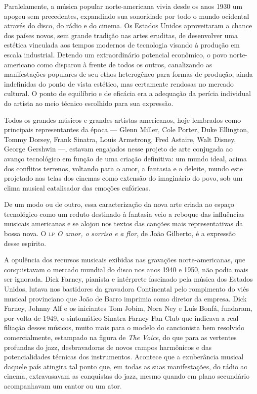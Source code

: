 Paralelamente, a música popular norte-americana vivia desde os anos 1930
um apogeu sem precedentes, expandindo sua sonoridade por todo o mundo
ocidental através do disco, do rádio e do cinema. Os Estados Unidos
aproveitaram a chance dos países novos, sem grande tradição nas artes
eruditas, de desenvolver uma estética vinculada aos tempos modernos de
tecnologia visando à produção em escala industrial. Detendo um
extraordinário potencial econômico, o povo norte-americano como disparou
à frente de todos os outros, canalizando as manifestações populares de
seu ethos heterogêneo para formas de produção, ainda indefinidas do
ponto de vista estético, mas certamente rendosas no mercado cultural. O
ponto de equilíbrio e de eficácia era a adequação da perícia individual
do artista ao meio técnico escolhido para sua expressão.

Todos os grandes músicos e grandes artistas americanos, hoje lembrados
como principais representantes da época --- Glenn Miller, Cole Porter, Duke
Ellington, Tommy Dorsey, Frank Sinatra, Louis Armstrong, Fred Astaire,
Walt Disney, George Gershwin ---, estavam engajados nesse projeto de arte
conjugada ao avanço tecnológico em função de uma criação definitiva: um
mundo ideal, acima dos conflitos terrenos, voltando para o amor, a
fantasia e o deleite, mundo este projetado nas telas dos cinemas como
extensão do imaginário do povo, sob um clima musical catalisador das
emoções eufóricas.

De um modo ou de outro, essa caracterização da nova arte criada no
espaço tecnológico como um reduto destinado à fantasia veio a reboque
das influências musicais americanas e se alojou nos textos das canções
mais representativas da bossa nova. O \textsc{lp} \textit{O amor, o sorriso e a flor}, de
João Gilberto, é a expressão desse espírito.

A opulência dos recursos musicais exibidas nas gravações
norte-americanas, que conquistavam o mercado mundial do disco nos anos
1940 e 1950, não podia mais ser ignorada. Dick Farney, pianista e intérprete
fascinado pela música dos Estados Unidos, lutava nos bastidores da
gravadora Continental pelo rompimento do viés musical provinciano que
João de Barro imprimia como diretor da empresa. Dick Farney, Johnny Alf
e os iniciantes Tom Jobim, Nora Ney e Luís Bonfá, fundaram, por volta de
1949, o sintomático Sinatra-Farney Fan Club que indicava a real filiação
desses músicos, muito mais para o modelo do cancionista bem resolvido
comercialmente, estampado na figura de \textit{The Voice}, do que para as
vertentes profundas do jazz, desbravadoras de novos campos harmônicos e
das potencialidades técnicas dos instrumentos. Acontece que a
exuberância musical daquele país atingira tal ponto que, em todas as
suas manifestações, do rádio ao cinema, extravasavam as conquistas do
jazz, mesmo quando em plano secundário acompanhavam um cantor ou um
ator.

